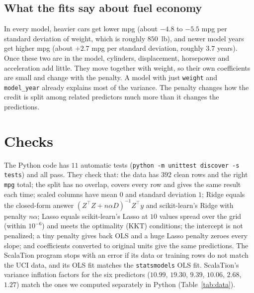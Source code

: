 \documentclass[11pt]{article}
\begin{document}
\subsection{What the fits say about fuel economy}
In every model, heavier cars get lower mpg (about $-4.8$ to $-5.5$ mpg per standard deviation of weight, which is roughly $850$~lb),
and newer model years get higher mpg (about $+2.7$ mpg per standard deviation, roughly $3.7$ years). Once these two are in the model,
cylinders, displacement, horsepower and acceleration add little. They move together with weight, so their own coefficients are small and
change with the penalty. A model with just \texttt{weight} and \texttt{model\_year} already explains most of the variance. The penalty changes how the
credit is split among related predictors much more than it changes the predictions.

\section{Checks}\label{sec:tests}

The Python code has $11$ automatic tests (\texttt{python -m unittest discover -s tests}) and all pass. They check that:
the data has $392$ clean rows and the right \texttt{mpg} total; the split has no overlap, covers every row and gives the same result each time;
scaled columns have mean $0$ and standard deviation $1$; Ridge equals the closed-form answer $(Z^\top Z+n\alpha D)^{-1}Z^\top y$ and
scikit-learn's Ridge with penalty $n\alpha$; Lasso equals scikit-learn's Lasso at $10$ values spread over the grid (within $10^{-6}$)
and meets the optimality (KKT) conditions; the intercept is not penalized; a tiny penalty gives back OLS and a huge Lasso penalty zeroes every
slope; and coefficients converted to original units give the same predictions. The ScalaTion program stops with an error if its data or training rows do not match
the UCI data, and its OLS fit matches the \texttt{statsmodels} OLS fit. ScalaTion's variance inflation factors for the six predictors
($10.99$, $19.30$, $9.39$, $10.06$, $2.68$, $1.27$) match the ones we computed separately in Python (Table~\ref{tab:data}).
\end{document}
